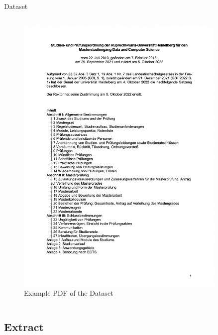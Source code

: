 \documentclass{beamer}
\begin{document}
\begin{frame}{Dataset}
\begin{columns}
\begin{column}{.5\textwidth}
\begin{figure}
        \includegraphics[width=0.9\textwidth]{Grafiken/DnC_PO.png}
        \caption{Example PDF of the Dataset}
      \end{figure}
    \end{column}
  \end{columns}
\end{frame}

\subsection{Extract}
\end{document}
